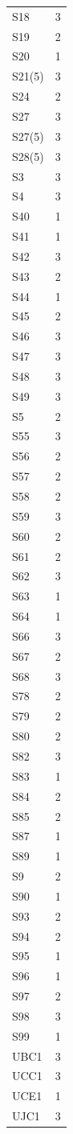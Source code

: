 \begin{longtable}{lr}
  S18 & 3 \\
  S19 & 2 \\
  S20 & 1 \\
  S21(5) & 3 \\
  S24 & 2 \\
  S27 & 3 \\
  S27(5) & 3 \\
  S28(5) & 3 \\
  S3 & 3 \\
  S4 & 3 \\
  S40 & 1 \\
  S41 & 1 \\
  S42 & 3 \\
  S43 & 2 \\
  S44 & 1 \\
  S45 & 2 \\
  S46 & 3 \\
  S47 & 3 \\
  S48 & 3 \\
  S49 & 3 \\
  S5 & 2 \\
  S55 & 3 \\
  S56 & 2 \\
  S57 & 2 \\
  S58 & 2 \\
  S59 & 3 \\
  S60 & 2 \\
  S61 & 2 \\
  S62 & 3 \\
  S63 & 1 \\
  S64 & 1 \\
  S66 & 3 \\
  S67 & 2 \\
  S68 & 3 \\
  S78 & 2 \\
  S79 & 2 \\
  S80 & 2 \\
  S82 & 3 \\
  S83 & 1 \\
  S84 & 2 \\
  S85 & 2 \\
  S87 & 1 \\
  S89 & 1 \\
  S9 & 2 \\
  S90 & 1 \\
  S93 & 2 \\
  S94 & 2 \\
  S95 & 1 \\
  S96 & 1 \\
  S97 & 2 \\
  S98 & 3 \\
  S99 & 1 \\
  UBC1 & 3 \\
  UCC1 & 3 \\
  UCE1 & 1 \\
  UJC1 & 3 \\
\end{longtable}
